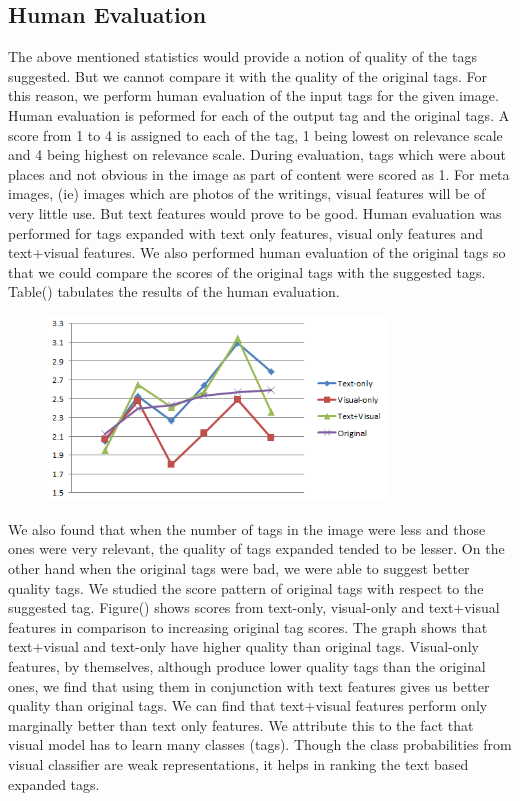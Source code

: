 \documentclass[12pt]{article}
\begin{document}
\subsection{Human Evaluation}
The above mentioned statistics would provide a notion of quality of the tags suggested. But
we cannot compare it with the quality of the original tags. For this reason, we perform human
evaluation of the input tags for the given image. Human evaluation is peformed for each of the
output tag and the original tags. A score from 1 to 4 is assigned to each of the tag, 1 being
lowest on relevance scale and 4 being highest on relevance scale. During evaluation, tags which
were about places and not obvious in the image as part of content were scored as 1. For meta images,
(ie) images which are photos of the writings, visual features will be of very little use. But
text features would prove to be good. Human evaluation was performed for tags expanded with
text only features, visual only features and text+visual features. We also performed human
evaluation of the original tags so that we could compare the scores of the original tags with
the suggested tags. Table() tabulates the results of the human evaluation.

\begin{figure}[t]
\begin{center}
\includegraphics[width=0.8\textwidth]{humanEvalGraph.png}
\end{center}
\end{figure}


We also found that when the number of tags in the image were less and those ones were very relevant,
the quality of tags expanded tended to be lesser. On the other hand when the original tags were bad,
we were able to suggest better quality tags. We studied the score pattern of original tags with respect
to the suggested tag. Figure() shows scores from text-only, visual-only and text+visual features in
comparison to increasing original tag scores. The graph shows that text+visual and text-only have
higher quality than original tags. Visual-only features, by themselves, although produce lower quality
tags than the original ones, we find that using them in conjunction with text features gives us better
quality than original tags. We can find that text+visual features perform only marginally better than
text only features. We attribute this to the fact that visual model has to learn many classes (tags).
Though the class probabilities from visual classifier are weak representations, it helps in ranking
the text based expanded tags.
\end{document}
